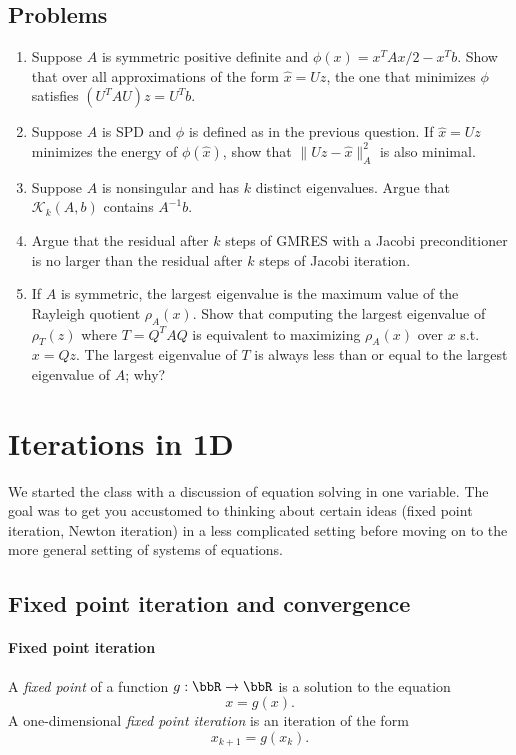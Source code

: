\documentclass[12pt, leqno]{article}
\newcommand{\calK}{\mathcal{K}}
\begin{document}
\subsection{Problems}

\begin{enumerate}
\item
  Suppose $A$ is symmetric positive definite and
  $\phi(x) = x^T A x/2 - x^T b$.  Show that over all
  approximations of the form $\hat{x} = Uz$, the one
  that minimizes $\phi$ satisfies $(U^T A U) z = U^T b$.
\item
  Suppose $A$ is SPD and $\phi$ is defined as in the previous
  question.  If $\hat{x} = Uz$ minimizes the energy of
  $\phi(\hat{x})$, show that $\|Uz-\hat{x}\|_A^2$ is also minimal.
\item
  Suppose $A$ is nonsingular and has $k$ distinct eigenvalues.  Argue that
  $\calK_k(A,b)$ contains $A^{-1} b$.
\item
  Argue that the residual after $k$ steps of GMRES with a Jacobi
  preconditioner is no larger than the residual after $k$ steps of
  Jacobi iteration.
\item
  If $A$ is symmetric, the largest eigenvalue is the
  maximum value of the Rayleigh quotient $\rho_A(x)$.
  Show that computing the largest eigenvalue of $\rho_{T}(z)$
  where $T = Q^T A Q$ is equivalent to maximizing $\rho_A(x)$
  over $x$ s.t. $x = Qz$.  The largest eigenvalue of $T$
  is always less than or equal to the largest eigenvalue of $A$; why?
\end{enumerate}

\newpage
\section{Iterations in 1D}

We started the class with a discussion of equation solving
in one variable.  The goal was to get you accustomed to thinking
about certain ideas (fixed point iteration, Newton iteration)
in a less complicated setting before moving on to the more general
setting of systems of equations.

\subsection{Fixed point iteration and convergence}

\paragraph{Fixed point iteration}
A {\em fixed point} of a function $g : \bbR \rightarrow \bbR$ is a
solution to the equation
\[
  x = g(x).
\]
A one-dimensional {\em fixed point iteration} is an iteration of the
form
\[
  x_{k+1} = g(x_k).
\]
\end{document}
